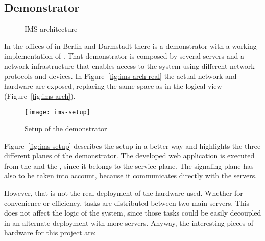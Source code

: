 \subsection{ Demonstrator} %
\label{sub:demonstrator}

\begin{figure}[htbp]
  \centering
  \caption{IMS architecture}
  \label{fig:ims}
\end{figure}

In the offices of  in Berlin and Darmstadt there is a demonstrator with a working implementation of .
That demonstrator is composed by several servers and a network infrastructure that enables access to the system using different network protocols and devices.
In Figure~\vref{fig:ims-arch-real} the actual network and hardware are exposed, replacing the same space as in the logical view (Figure~\vref{fig:ims-arch}).

\begin{figure}[htbp]
  \centering
    \texttt{[image: ims-setup]}
  \caption{Setup of the demonstrator}
  \label{fig:ims-setup}
\end{figure}

Figure~\vref{fig:ims-setup} describes the setup in a better way and highlights the three different planes of the demonstrator.
The developed web application is executed from the  and the , since it belongs to the service plane.
The signaling plane has also to be taken into account, because it communicates directly with the servers.

However, that is not the real deployment of the hardware used.
Whether for convenience or efficiency, tasks are distributed between two main servers.
This does not affect the logic of the system, since those tasks could be easily decoupled in an alternate deployment with more servers.
Anyway, the interesting pieces of hardware for this project are:

